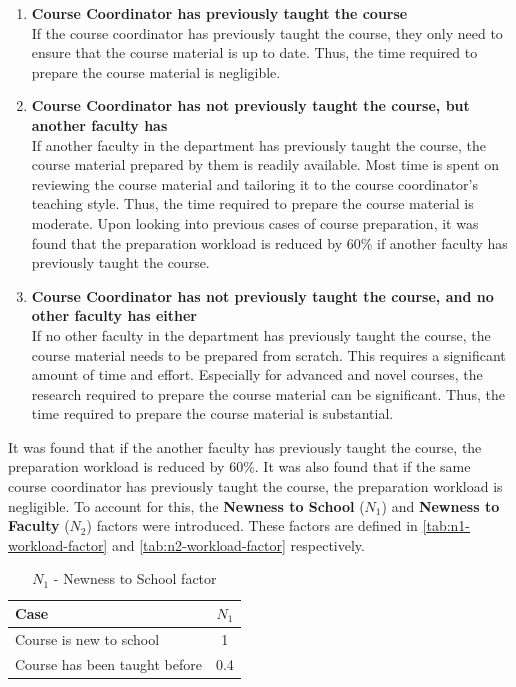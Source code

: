 \begin{enumerate}
  \item \textbf{Course Coordinator has previously taught the course}\\
        If the course coordinator has previously taught the course, they only need to ensure that the course material is up to date. Thus, the time required to prepare the course material is negligible.

  \item \textbf{Course Coordinator has not previously taught the course, but another faculty has}\\
        If another faculty in the department has previously taught the course, the course material prepared by them is readily available. Most time is spent on reviewing the course material and tailoring it to the course coordinator's teaching style. Thus, the time required to prepare the course material is moderate. Upon looking into previous cases of course preparation, it was found that the preparation workload is reduced by 60\% if another faculty has previously taught the course.

  \item \textbf{Course Coordinator has not previously taught the course, and no other faculty has either}\\
        If no other faculty in the department has previously taught the course, the course material needs to be prepared from scratch. This requires a significant amount of time and effort. Especially for advanced and novel courses, the research required to prepare the course material can be significant. Thus, the time required to prepare the course material is substantial.
\end{enumerate}

It was found that if the another faculty has previously taught the course, the preparation workload is reduced by 60\%. It was also found that if the same course coordinator has previously taught the course, the preparation workload is negligible. To account for this, the \textbf{Newness to School} (\(N_1\)) and \textbf{Newness to Faculty} (\(N_2\)) factors were introduced. These factors are defined in \autoref{tab:n1-workload-factor} and \autoref{tab:n2-workload-factor} respectively.

\begin{table}[ht]
  \label{tab:n1-workload-factor}
  \centering
  \begin{tabular}{|l|c|}
    \hline
    \textbf{Case}                 & \textbf{\(N_1\)} \\ \hline
    Course is new to school       & 1                \\ \hline
    Course has been taught before & 0.4              \\ \hline
  \end{tabular}
  \caption{\(N_1\) - Newness to School factor}
\end{table}

